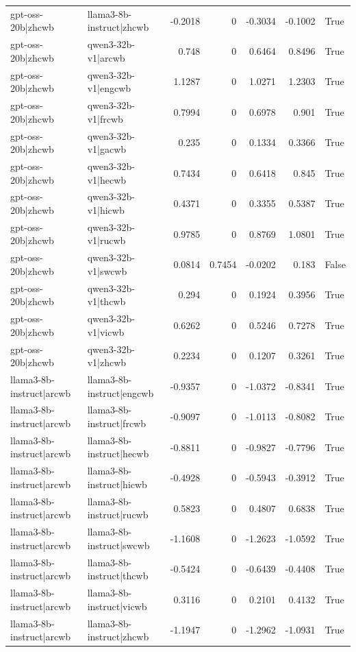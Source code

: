 \begin{table}
\begin{tabular}{l l r r r r l}
gpt-oss-20b|zhcwb & llama3-8b-instruct|zhcwb & -0.2018 & 0 & -0.3034 & -0.1002 & True \\
gpt-oss-20b|zhcwb & qwen3-32b-v1|arcwb & 0.748 & 0 & 0.6464 & 0.8496 & True \\
gpt-oss-20b|zhcwb & qwen3-32b-v1|engcwb & 1.1287 & 0 & 1.0271 & 1.2303 & True \\
gpt-oss-20b|zhcwb & qwen3-32b-v1|frcwb & 0.7994 & 0 & 0.6978 & 0.901 & True \\
gpt-oss-20b|zhcwb & qwen3-32b-v1|gacwb & 0.235 & 0 & 0.1334 & 0.3366 & True \\
gpt-oss-20b|zhcwb & qwen3-32b-v1|hecwb & 0.7434 & 0 & 0.6418 & 0.845 & True \\
gpt-oss-20b|zhcwb & qwen3-32b-v1|hicwb & 0.4371 & 0 & 0.3355 & 0.5387 & True \\
gpt-oss-20b|zhcwb & qwen3-32b-v1|rucwb & 0.9785 & 0 & 0.8769 & 1.0801 & True \\
gpt-oss-20b|zhcwb & qwen3-32b-v1|swcwb & 0.0814 & 0.7454 & -0.0202 & 0.183 & False \\
gpt-oss-20b|zhcwb & qwen3-32b-v1|thcwb & 0.294 & 0 & 0.1924 & 0.3956 & True \\
gpt-oss-20b|zhcwb & qwen3-32b-v1|vicwb & 0.6262 & 0 & 0.5246 & 0.7278 & True \\
gpt-oss-20b|zhcwb & qwen3-32b-v1|zhcwb & 0.2234 & 0 & 0.1207 & 0.3261 & True \\
llama3-8b-instruct|arcwb & llama3-8b-instruct|engcwb & -0.9357 & 0 & -1.0372 & -0.8341 & True \\
llama3-8b-instruct|arcwb & llama3-8b-instruct|frcwb & -0.9097 & 0 & -1.0113 & -0.8082 & True \\
llama3-8b-instruct|arcwb & llama3-8b-instruct|hecwb & -0.8811 & 0 & -0.9827 & -0.7796 & True \\
llama3-8b-instruct|arcwb & llama3-8b-instruct|hicwb & -0.4928 & 0 & -0.5943 & -0.3912 & True \\
llama3-8b-instruct|arcwb & llama3-8b-instruct|rucwb & 0.5823 & 0 & 0.4807 & 0.6838 & True \\
llama3-8b-instruct|arcwb & llama3-8b-instruct|swcwb & -1.1608 & 0 & -1.2623 & -1.0592 & True \\
llama3-8b-instruct|arcwb & llama3-8b-instruct|thcwb & -0.5424 & 0 & -0.6439 & -0.4408 & True \\
llama3-8b-instruct|arcwb & llama3-8b-instruct|vicwb & 0.3116 & 0 & 0.2101 & 0.4132 & True \\
llama3-8b-instruct|arcwb & llama3-8b-instruct|zhcwb & -1.1947 & 0 & -1.2962 & -1.0931 & True \\

\end{tabular}
\end{table}
